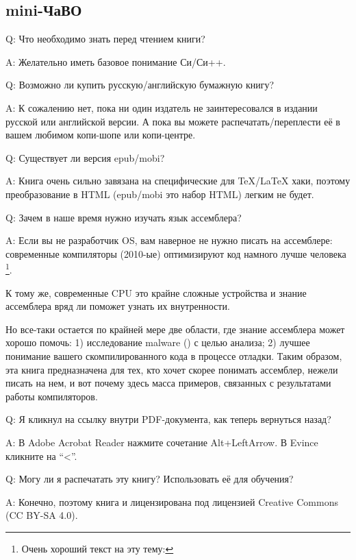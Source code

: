 \subsection*{mini-ЧаВО}

\par Q: Что необходимо знать перед чтением книги?
\par A: Желательно иметь базовое понимание Си/Си++.

\par Q: Возможно ли купить русскую/английскую бумажную книгу?
\par A: К сожалению нет, пока ни один издатель не заинтересовался в издании русской или английской версии.
А пока вы можете распечатать/переплести её в вашем любимом копи-шопе или копи-центре.

\par Q: Существует ли версия epub/mobi?
\par A: Книга очень сильно завязана на специфические для TeX/LaTeX хаки, поэтому преобразование в HTML (epub/mobi это набор HTML)
легким не будет.

\par Q: Зачем в наше время нужно изучать язык ассемблера?
\par A: Если вы не разработчик \ac{OS}, вам наверное не нужно писать на ассемблере: современные компиляторы (2010-ые) оптимизируют код намного лучше человека
\footnote{Очень хороший текст на эту тему: \InSqBrackets{\AgnerFog}}.

К тому же, современные \ac{CPU} это крайне сложные устройства и знание ассемблера вряд ли
поможет узнать их внутренности.

Но все-таки остается по крайней мере две области, где знание ассемблера может хорошо помочь:
1) исследование malware () с целью анализа; 2) лучшее понимание
вашего скомпилированного кода в процессе отладки.
Таким образом, эта книга предназначена для тех, кто хочет скорее понимать ассемблер,
нежели писать на нем, и вот почему здесь масса примеров, связанных с результатами
работы компиляторов.

\par Q: Я кликнул на ссылку внутри PDF-документа, как теперь вернуться назад?
\par A: В Adobe Acrobat Reader нажмите сочетание Alt+LeftArrow. В Evince кликните на ``<''.

\par Q: Могу ли я распечатать эту книгу? Использовать её для обучения?
\par A: Конечно, поэтому книга и лицензирована под лицензией Creative Commons (CC BY-SA 4.0).

